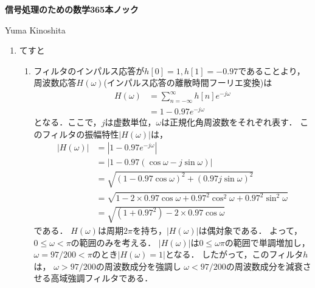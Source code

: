 \documentclass[10pt]{jsarticle}
\begin{document}
\begin{center}
  {\bf \Large 信号処理のための数学365本ノック}
\end{center}
\begin{flushright}
  Yuma Kinoshita
\end{flushright}
\setlength{\leftmarginii}{3pt}

\begin{enumerate}[label=問\arabic*.]
  \vspace{2mm}
  \item てすと
  \vspace{1mm}
  \begin{enumerate}[label=(\arabic*)]
    \item フィルタのインパルス応答が$h[0] = 1, h[1] = -0.97$であることより，
      周波数応答$H(\omega)$(インパルス応答の離散時間フーリエ変換)は
      \begin{align}
        H(\omega) &= \sum_{n = -\infty}^{\infty} h[n] e^{-j\omega} \\
                  &= 1 - 0.97 e^{-j \omega}
      \end{align}
      となる．ここで，$j$は虚数単位，$\omega$は正規化角周波数をそれぞれ表す．
      このフィルタの振幅特性$|H(\omega)|$は，
      \begin{align}
        |H(\omega)| &= | 1 - 0.97 e^{-j \omega}| \\
                    &= | 1 - 0.97 (\cos \omega - j \sin \omega)| \\
                    &= \sqrt{(1 - 0.97 \cos \omega)^2 + (0.97 j \sin \omega)^2} \\
                    &= \sqrt{1 - 2 \times 0.97 \cos \omega + 0.97^2 \cos^2 \omega
                     + 0.97^2 \sin^2 \omega} \\
                    &= \sqrt{(1 + 0.97^2) - 2 \times 0.97 \cos \omega}
      \end{align}
      である．
      $H(\omega)$は周期$2\pi$を持ち，$|H(\omega)|$は偶対象である．
      よって，$0 \le \omega < \pi$の範囲のみを考える．
      $|H(\omega)|$は$0 \le \omega \pi$の範囲で単調増加し，
      $\omega = 97 / 200 < \pi$のとき$|H(\omega) = 1|$となる．
      したがって，このフィルタ$h$は，
      $\omega > 97 / 200$の周波数成分を強調し
      $\omega < 97 / 200$の周波数成分を減衰させる高域強調フィルタである．
  \end{enumerate}
  
\end{enumerate}
\end{document}
